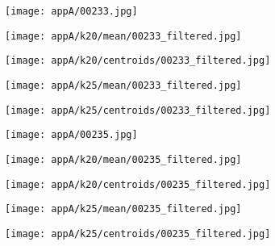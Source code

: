 \documentclass[draft,final]{vutinfth} %
\begin{document}
\begin{appendices}
\begin{figure}[h]
\centering
  \begin{subfigure}[t]{0.19\columnwidth}
    \centering
    \texttt{[image: appA/00233.jpg]}
  \end{subfigure}
  \begin{subfigure}[t]{0.19\columnwidth}
    \centering
    \texttt{[image: appA/k20/mean/00233\_filtered.jpg]}
  \end{subfigure}
  \begin{subfigure}[t]{0.19\columnwidth}
    \centering
    \texttt{[image: appA/k20/centroids/00233\_filtered.jpg]}
  \end{subfigure}
  \begin{subfigure}[t]{0.19\columnwidth}
    \centering
    \texttt{[image: appA/k25/mean/00233\_filtered.jpg]}
  \end{subfigure}
  \begin{subfigure}[t]{0.19\columnwidth}
    \centering
    \texttt{[image: appA/k25/centroids/00233\_filtered.jpg]}
  \end{subfigure}
\caption{}
\end{figure}  

\begin{figure}[h]
\centering
  \begin{subfigure}[t]{0.19\columnwidth}
    \centering
    \texttt{[image: appA/00235.jpg]}
  \end{subfigure}
  \begin{subfigure}[t]{0.19\columnwidth}
    \centering
    \texttt{[image: appA/k20/mean/00235\_filtered.jpg]}
  \end{subfigure}
  \begin{subfigure}[t]{0.19\columnwidth}
    \centering
    \texttt{[image: appA/k20/centroids/00235\_filtered.jpg]}
  \end{subfigure}
  \begin{subfigure}[t]{0.19\columnwidth}
    \centering
    \texttt{[image: appA/k25/mean/00235\_filtered.jpg]}
  \end{subfigure}
  \begin{subfigure}[t]{0.19\columnwidth}
    \centering
    \texttt{[image: appA/k25/centroids/00235\_filtered.jpg]}
  \end{subfigure}
\caption{}
\end{figure}  


\end{appendices}
\end{document}
